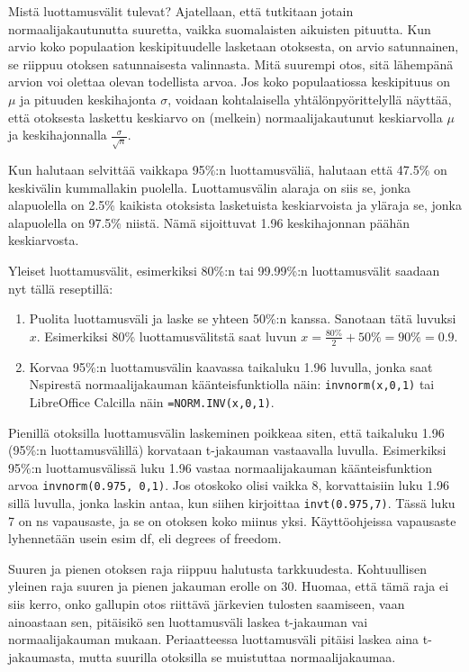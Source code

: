 \documentclass[12pt,leqno,a4paper,oneside]{amsart}
\theoremstyle{definition}
\theoremstyle{remark}
\numberwithin{equation}{section}
\begin{document}
Mistä luottamusvälit tulevat? Ajatellaan, että tutkitaan jotain normaalijakautunutta suuretta, vaikka suomalaisten aikuisten pituutta.
Kun arvio koko populaation keskipituudelle lasketaan otoksesta, on arvio satunnainen, se riippuu otoksen satunnaisesta valinnasta. 
Mitä suurempi otos, sitä lähempänä arvion voi olettaa olevan todellista arvoa. Jos koko populaatiossa keskipituus on $\mu$ ja pituuden keskihajonta
$\sigma$, voidaan kohtalaisella yhtälönpyörittelyllä näyttää, että otoksesta laskettu keskiarvo on (melkein) normaalijakautunut keskiarvolla $\mu$ ja 
keskihajonnalla $\frac{\sigma}{\sqrt{n}} .$

Kun halutaan selvittää vaikkapa 95\%:n luottamusväliä, halutaan että 47.5\% on keskivälin kummallakin puolella. Luottamusvälin alaraja on siis se,
jonka alapuolella on 2.5\% kaikista otoksista lasketuista keskiarvoista ja yläraja se, jonka alapuolella on 97.5\% niistä. Nämä sijoittuvat 1.96 
keskihajonnan päähän keskiarvosta.

Yleiset luottamusvälit, esimerkiksi 80\%:n tai 99.99\%:n luottamusvälit saadaan nyt tällä reseptillä:
\begin{enumerate}
 \item 
 Puolita luottamusväli ja laske se yhteen 50\%:n kanssa. Sanotaan tätä luvuksi $x$. 
 Esimerkiksi 80\% luottamusvälitstä saat luvun $x=\frac{80\%}{2} + 50\% = 90\% = 0.9$.
 \item
 Korvaa 95\%:n luottamusvälin kaavassa taikaluku 1.96 luvulla, jonka saat Nspirestä normaalijakauman käänteisfunktiolla näin:
 \texttt{invnorm(x,0,1)} tai LibreOffice Calcilla näin \texttt{=NORM.INV(x,0,1)}.
\end{enumerate}

Pienillä otoksilla luottamusvälin laskeminen poikkeaa siten, että taikaluku 1.96 (95\%:n luottamusvälillä) korvataan t-jakauman vastaavalla luvulla.
Esimerkiksi 95\%:n luottamusvälissä luku 1.96 vastaa normaalijakauman käänteisfunktion arvoa \texttt{invnorm(0.975, 0,1)}. Jos otoskoko olisi vaikka
8, korvattaisiin luku 1.96 sillä luvulla, jonka laskin antaa, kun siihen kirjoittaa \texttt{invt(0.975,7)}. Tässä luku 7 on
ns vapausaste, ja se on otoksen koko miinus yksi. Käyttöohjeissa vapausaste lyhennetään usein esim df, eli degrees of freedom.

Suuren ja pienen otoksen raja riippuu halutusta tarkkuudesta. Kohtuullisen yleinen raja suuren ja pienen jakauman
erolle on 30. Huomaa, että tämä raja ei siis kerro,
onko gallupin otos riittävä järkevien tulosten saamiseen, vaan ainoastaan sen, pitäisikö sen luottamusväli laskea t-jakauman vai normaalijakauman mukaan.
Periaatteessa luottamusväli pitäisi laskea aina t-jakaumasta, mutta suurilla otoksilla se muistuttaa normaalijakaumaa.
\end{document}
